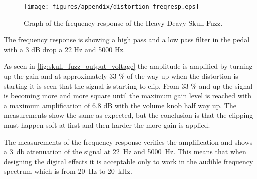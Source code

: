 \begin{figure}[htbp]
	\centering
	\texttt{[image: figures/appendix/distortion\_freqresp.eps]}
	\caption{Graph of the frequency response of the Heavy Deavy Skull Fuzz.}
	\label{fig:skull_fuzz_output_freq_resp}
\end{figure}

The frequency response is showing a high pass and a low pass filter in the pedal with a 3 dB drop a 22 Hz and 5000 Hz.

As seen in \autoref{fig:skull_fuzz_output_voltage} the amplitude is amplified by turning up the gain and at approximately 33 \% of the way up when the distortion is starting it is seen that the signal is starting to clip. From 33 \% and up the signal is becoming more and more square until the maximum gain level is reached with a maximum amplification of 6.8 dB with the volume knob half way up. The measurements show the same as expected, but the conclusion is that the clipping must happen soft at first and then harder the more gain is applied.

The measurements of the frequency response verifies the amplification and shows a \SI{3}{\decibel} attenuation of the signal at \SI{22}{\hertz} and \SI{5000}{\hertz}. This means that when designing the digital effects it is acceptable only to work in the audible frequency spectrum which is from \SI{20}{\hertz} to \SI{20}{\kilo \hertz}. 